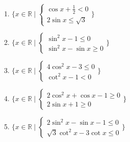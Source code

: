 \documentclass[11pt,a4paper]{article}
\begin{document}
\begin{enumerate}
\item $\displaystyle \{x \in \mathbb{R} \mid \begin{cases} \cos x + \frac{1}{2} < 0 \\ 2\sin x \le \sqrt{3} \end{cases}\}$
\item $\displaystyle \{x \in \mathbb{R} \mid \begin{cases} \sin^{2} x - 1 \le 0 \\ \sin^{2} x - \sin x \ge 0 \end{cases}\}$
\item $\displaystyle \{x \in \mathbb{R} \mid \begin{cases} 4\cos^{2} x - 3 \le 0 \\ \cot^{2} x - 1 < 0 \end{cases}\}$
\item $\displaystyle \{x \in \mathbb{R} \mid \begin{cases} 2\cos^{2} x + \cos x - 1 \ge 0 \\ 2\sin x + 1 \ge 0 \end{cases}\}$
\item $\displaystyle \{x \in \mathbb{R} \mid \begin{cases} 2\sin^{2} x - \sin x - 1 \le 0 \\ \sqrt{3}\cot^{2} x - 3\cot x \le 0 \end{cases}\}$
\end{enumerate}
\end{document}
